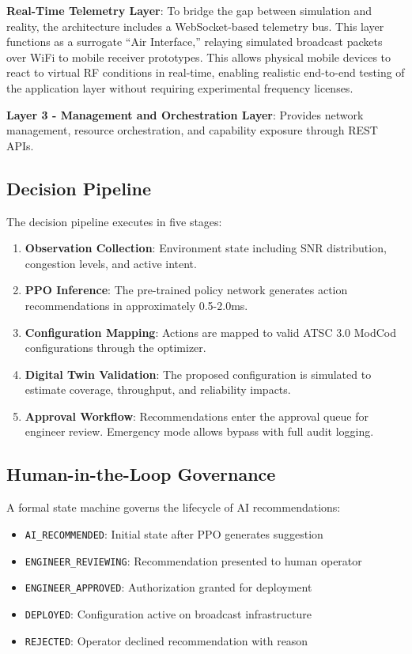 \documentclass[conference]{IEEEtran}
\begin{document}
\textbf{Real-Time Telemetry Layer}: To bridge the gap between simulation and reality, the architecture includes a WebSocket-based telemetry bus. This layer functions as a surrogate ``Air Interface,'' relaying simulated broadcast packets over WiFi to mobile receiver prototypes. This allows physical mobile devices to react to virtual RF conditions in real-time, enabling realistic end-to-end testing of the application layer without requiring experimental frequency licenses.

\textbf{Layer 3 - Management and Orchestration Layer}: Provides network management, resource orchestration, and capability exposure through REST APIs.

\subsection{Decision Pipeline}

The decision pipeline executes in five stages:

\begin{enumerate}
\item \textbf{Observation Collection}: Environment state including SNR distribution, congestion levels, and active intent.

\item \textbf{PPO Inference}: The pre-trained policy network generates action recommendations in approximately 0.5-2.0ms.

\item \textbf{Configuration Mapping}: Actions are mapped to valid ATSC 3.0 ModCod configurations through the optimizer.

\item \textbf{Digital Twin Validation}: The proposed configuration is simulated to estimate coverage, throughput, and reliability impacts.

\item \textbf{Approval Workflow}: Recommendations enter the approval queue for engineer review. Emergency mode allows bypass with full audit logging.
\end{enumerate}

\subsection{Human-in-the-Loop Governance}

A formal state machine governs the lifecycle of AI recommendations:

\begin{itemize}
\item \texttt{AI\_RECOMMENDED}: Initial state after PPO generates suggestion
\item \texttt{ENGINEER\_REVIEWING}: Recommendation presented to human operator
\item \texttt{ENGINEER\_APPROVED}: Authorization granted for deployment
\item \texttt{DEPLOYED}: Configuration active on broadcast infrastructure
\item \texttt{REJECTED}: Operator declined recommendation with reason
\end{itemize}
\end{document}

